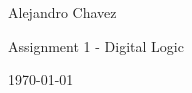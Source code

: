 \documentclass{article}
\begin{document}
\hfill Alejandro Chavez

\hfill Assignment 1 - Digital Logic

\hfill \today \\
\end{document}
